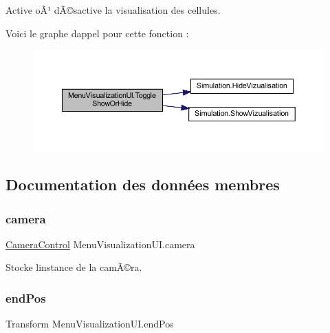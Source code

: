 Active oÃ¹ dÃ©sactive la visualisation des cellules. 

Voici le graphe d\textquotesingle{}appel pour cette fonction \+:
\nopagebreak
\begin{figure}[H]
\begin{center}
\leavevmode
\includegraphics[width=350pt]{class_menu_visualization_u_i_acc1ed888dd19359811e473ffbd2fa86a_cgraph}
\end{center}
\end{figure}


\subsection{Documentation des données membres}
\mbox{\label{class_menu_visualization_u_i_acbeec950a81f60bf3cd493d9e4a99896}} 
\subsubsection{\texorpdfstring{camera}{camera}}
{\footnotesize\ttfamily \mbox{\hyperlink{class_camera_control}{Camera\+Control}} Menu\+Visualization\+U\+I.\+camera\hspace{0.3cm}{\ttfamily [private]}}



Stocke l\textquotesingle{}instance de la camÃ©ra. 

\mbox{\label{class_menu_visualization_u_i_aca26bc81a47e95274e282b0688d48ab0}} 
\subsubsection{\texorpdfstring{end\+Pos}{endPos}}
{\footnotesize\ttfamily Transform Menu\+Visualization\+U\+I.\+end\+Pos\hspace{0.3cm}{\ttfamily [private]}}



